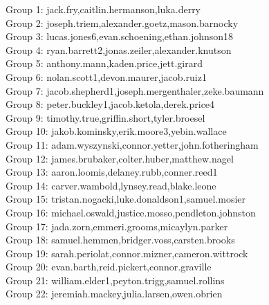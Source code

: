 \documentclass[10pt]{beamer}
\begin{document}
\begin{frame}
\footnotesize
Group 1: jack.fry,caitlin.hermanson,luka.derry\\
Group 2: joseph.triem,alexander.goetz,mason.barnocky\\
Group 3: lucas.jones6,evan.schoening,ethan.johnson18\\
Group 4: ryan.barrett2,jonas.zeiler,alexander.knutson\\
Group 5: anthony.mann,kaden.price,jett.girard\\
Group 6: nolan.scott1,devon.maurer,jacob.ruiz1\\
Group 7: jacob.shepherd1,joseph.mergenthaler,zeke.baumann\\
Group 8: peter.buckley1,jacob.ketola,derek.price4\\
Group 9: timothy.true,griffin.short,tyler.broesel\\
Group 10: jakob.kominsky,erik.moore3,yebin.wallace\\
Group 11: adam.wyszynski,connor.yetter,john.fotheringham\\
Group 12: james.brubaker,colter.huber,matthew.nagel\\
Group 13: aaron.loomis,delaney.rubb,conner.reed1\\
Group 14: carver.wambold,lynsey.read,blake.leone\\
Group 15: tristan.nogacki,luke.donaldson1,samuel.mosier\\
Group 16: michael.oswald,justice.mosso,pendleton.johnston\\
Group 17: jada.zorn,emmeri.grooms,micaylyn.parker\\
Group 18: samuel.hemmen,bridger.voss,carsten.brooks\\
Group 19: sarah.periolat,connor.mizner,cameron.wittrock\\
Group 20: evan.barth,reid.pickert,connor.graville\\
Group 21: william.elder1,peyton.trigg,samuel.rollins\\
Group 22: jeremiah.mackey,julia.larsen,owen.obrien\\\end{frame}
\end{document}
